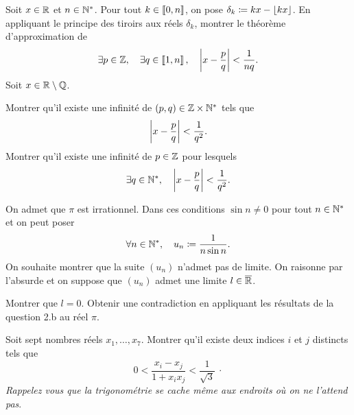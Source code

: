 \documentclass{magnolia}
\begin{document}
\begin{questions}
\question Soit $x\in\mathbb{R}$ et $n\in{\mathbb{N}^*}$. Pour tout $k\in\left\llbracket 0,n\right\rrbracket$, on pose
  $\delta_k\coloneqq kx-\left\lfloor kx\right\rfloor$. En appliquant le principe des tiroirs aux
  réels $\delta_k$, montrer le théorème d'approximation de 
  \[\exists p\in\mathbb{Z},\quad \exists q\in\left\llbracket 1,n\right\rrbracket,\quad \left|x-\frac{p}{q}\right|<\frac{1}{nq}.\]
\question Soit $x\in\mathbb{R}\setminus\mathbb{Q}$.
  \begin{questions}
  \question Montrer qu'il existe une infinité de $(p,q)\in\mathbb{Z}\times{\mathbb{N}^*}$ tels
    que
    \[\left|x-\frac{p}{q}\right|<\frac{1}{q^2}.\]
  \question Montrer qu'il existe une infinité de $p\in\mathbb{Z}$ pour lesquels
    \[\exists q\in{\mathbb{N}^*},\quad \left|x-\frac{p}{q}\right|<\frac{1}{q^2}.\]
  \end{questions}
\question On admet que $\pi$ est irrationnel. Dans ces conditions
  $\sin n\neq 0$ pour tout $n\in{\mathbb{N}^*}$ et on peut poser
  \[\forall n\in{\mathbb{N}^*},\quad u_n\coloneqq\frac{1}{n\sin n}.\]
  On souhaite montrer que la suite $(u_n)$ n'admet pas de limite. On raisonne
  par l'absurde et on suppose que $(u_n)$ admet une limite
  $l\in\overline{\mathbb{R}}$.
  \begin{questions}
  \question Montrer que $l=0$.
  \question Obtenir une contradiction en appliquant les résultats de
    la question 2.b au réel $\pi$.
  \end{questions}

\end{questions}

Soit sept nombres réels $x_1,\ldots,x_7$. Montrer qu'il existe deux indices $i$
et $j$ distincts tels que 
\[0<\frac{x_i-x_j}{1+x_ix_j}<\frac{1}{\sqrt{3}}\>\cdot\]
\emph{Rappelez vous que la trigonométrie se cache même aux endroits où on ne l'attend pas}.

\end{document}

